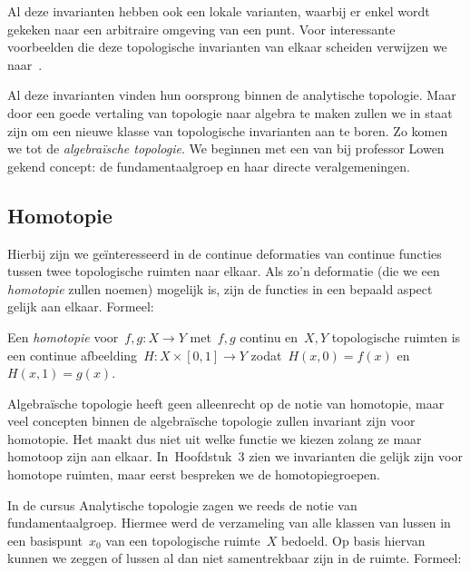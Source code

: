 \documentclass[a4paper,11pt,openany,oneside,article]{memoir}
\begin{document}
Al deze invarianten hebben ook een lokale varianten, waarbij er enkel wordt gekeken naar een arbitraire omgeving van een punt. Voor interessante voorbeelden die deze topologische invarianten van elkaar scheiden verwijzen we naar~\cite{counterexamples-in-topology}.
\vspace{1em}

Al deze invarianten vinden hun oorsprong binnen de analytische topologie. Maar door een goede vertaling van topologie naar algebra te maken zullen we in staat zijn om een nieuwe klasse van topologische invarianten aan te boren. Zo komen we tot de \emph{algebra\"ische topologie}. We beginnen met een van bij professor Lowen gekend concept: de fundamentaalgroep en haar directe veralgemeningen.

\subsection{Homotopie}
Hierbij zijn we ge\"interesseerd in de continue deformaties van continue functies tussen twee topologische ruimten naar elkaar. Als zo'n deformatie (die we een \emph{homotopie} zullen noemen) mogelijk is, zijn de functies in een bepaald aspect gelijk aan elkaar. Formeel:

\begin{definition}
  Een \emph{homotopie} voor~$f,g\colon X\to Y$ met~$f,g$ continu en~$X,Y$ topologische ruimten is een continue afbeelding~$H\colon X\times[0,1]\to Y$ zodat~$H(x,0)=f(x)$ en~$H(x,1)=g(x)$.
\end{definition}

Algebra\"ische topologie heeft geen alleenrecht op de notie van homotopie, maar veel concepten binnen de algebra\"ische topologie zullen invariant zijn voor homotopie. Het maakt dus niet uit welke functie we kiezen zolang ze maar homotoop zijn aan elkaar. In~Hoofdstuk~3 zien we invarianten die gelijk zijn voor homotope ruimten, maar eerst bespreken we de homotopiegroepen.

In de cursus Analytische topologie zagen we reeds de notie van fundamentaalgroep. Hiermee werd de verzameling van alle klassen van lussen in een basispunt~$x_0$ van een topologische ruimte~$X$ bedoeld. Op basis hiervan kunnen we zeggen of lussen al dan niet samentrekbaar zijn in de ruimte. Formeel:
\end{document}
